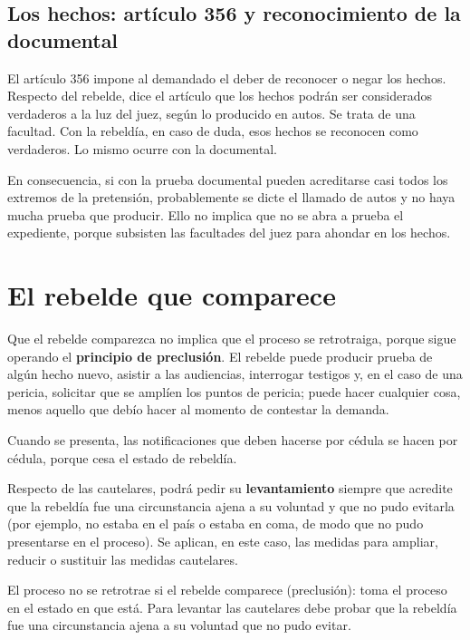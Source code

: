 \documentclass[12pt,oneside]{book}
\begin{document}
\subsection{Los hechos: art\'iculo 356 y reconocimiento de la documental}

El art\'iculo 356 impone al demandado el deber de reconocer o negar los hechos. Respecto del rebelde, dice el art\'iculo que los hechos podr\'an ser considerados verdaderos a la luz del juez, seg\'un lo producido en autos. Se trata de una facultad. Con la rebeld\'ia, en caso de duda, esos hechos se reconocen como verdaderos. Lo mismo ocurre con la documental.

En consecuencia, si con la prueba documental pueden acreditarse casi todos los extremos de la pretensi\'on, probablemente se dicte el llamado de autos y no haya mucha prueba que producir. Ello no implica que no se abra a prueba el expediente, porque subsisten las facultades del juez para ahondar en los hechos.

\section{El rebelde que comparece}

Que el rebelde comparezca no implica que el proceso se retrotraiga, porque sigue operando el \textbf{principio de preclusi\'on}. El rebelde puede producir prueba de alg\'un hecho nuevo, asistir a las audiencias, interrogar testigos y, en el caso de una pericia, solicitar que se ampl\'ien los puntos de pericia; puede hacer cualquier cosa, menos aquello que deb\'io hacer al momento de contestar la demanda.

Cuando se presenta, las notificaciones que deben hacerse por c\'edula se hacen por c\'edula, porque cesa el estado de rebeld\'ia.

Respecto de las cautelares, podr\'a pedir su \textbf{levantamiento} siempre que acredite que la rebeld\'ia fue una circunstancia ajena a su voluntad y que no pudo evitarla (por ejemplo, no estaba en el pa\'is o estaba en coma, de modo que no pudo presentarse en el proceso). Se aplican, en este caso, las medidas para ampliar, reducir o sustituir las medidas cautelares.

\begin{important}
El proceso no se retrotrae si el rebelde comparece (preclusi\'on): toma el proceso en el estado en que est\'a. Para levantar las cautelares debe probar que la rebeld\'ia fue una circunstancia ajena a su voluntad que no pudo evitar.
\end{important}
\end{document}
